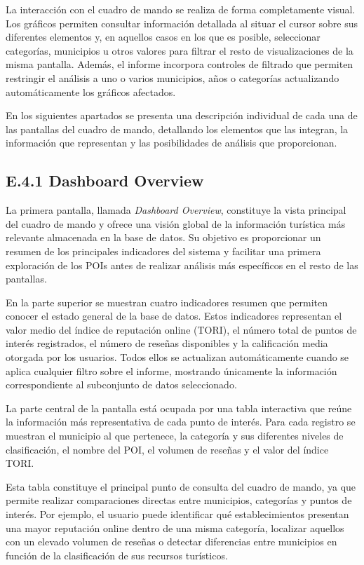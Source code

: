 La interacción con el cuadro de mando se realiza de forma completamente visual. Los gráficos permiten consultar información detallada al situar el cursor sobre sus diferentes elementos y, en aquellos casos en los que es posible, seleccionar categorías, municipios u otros valores para filtrar el resto de visualizaciones de la misma pantalla. Además, el informe incorpora controles de filtrado que permiten restringir el análisis a uno o varios municipios, años o categorías actualizando automáticamente los gráficos afectados.

En los siguientes apartados se presenta una descripción individual de cada una de las pantallas del cuadro de mando, detallando los elementos que las integran, la información que representan y las posibilidades de análisis que proporcionan.

\subsection{E.4.1 Dashboard Overview}

La primera pantalla, llamada \textit{Dashboard Overview}, constituye la vista principal del cuadro de mando y ofrece una visión global de la información turística más relevante almacenada en la base de datos. Su objetivo es proporcionar un resumen de los principales indicadores del sistema y facilitar una primera exploración de los POIs antes de realizar análisis más específicos en el resto de las pantallas.

En la parte superior se muestran cuatro indicadores resumen que permiten conocer el estado general de la base de datos. Estos indicadores representan el valor medio del índice de reputación online (TORI), el número total de puntos de interés registrados, el número de reseñas disponibles y la calificación media otorgada por los usuarios. Todos ellos se actualizan automáticamente cuando se aplica cualquier filtro sobre el informe, mostrando únicamente la información correspondiente al subconjunto de datos seleccionado.

La parte central de la pantalla está ocupada por una tabla interactiva que reúne la información más representativa de cada punto de interés. Para cada registro se muestran el municipio al que pertenece, la categoría y sus diferentes niveles de clasificación, el nombre del POI, el volumen de reseñas y el valor del índice TORI.

Esta tabla constituye el principal punto de consulta del cuadro de mando, ya que permite realizar comparaciones directas entre municipios, categorías y puntos de interés. Por ejemplo, el usuario puede identificar qué establecimientos presentan una mayor reputación online dentro de una misma categoría, localizar aquellos con un elevado volumen de reseñas o detectar diferencias entre municipios en función de la clasificación de sus recursos turísticos.

